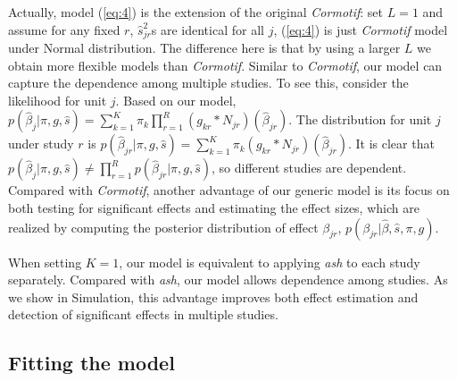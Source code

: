 \documentclass[12pt]{article}
\begin{document}
\vspace{4mm}\noindent Actually, model (\ref{eq:4}) is the extension of the original \emph{Cormotif}: set $L=1$ and assume for any fixed $r$, $\hat s_{jr}^2$s are identical for all $j$, (\ref{eq:4}) is just \emph{Cormotif} model under Normal distribution. The difference here is that by using a larger $L$ we obtain more flexible models than \emph{Cormotif}. Similar to \emph{Cormotif}, our model can capture the dependence among multiple studies. To see this, consider the likelihood for unit $j$. Based on our model, $p(\hat\beta_j|\pi,g,\hat s) = \sum_{k=1}^K\pi_k\prod_{r=1}^R(g_{kr}*N_{jr})(\hat\beta_{jr})$. The distribution for unit $j$ under study $r$ is $p(\hat\beta_{jr}|\pi,g,\hat s) = \sum_{k=1}^K\pi_k(g_{kr}*N_{jr})(\hat\beta_{jr})$. It is clear that $p(\hat\beta_j|\pi,g,\hat s) \neq \prod_{r=1}^Rp(\hat\beta_{jr}|\pi,g,\hat s)$, so different studies are dependent. Compared with \emph{Cormotif}, another advantage of our generic model is its focus on both testing for significant effects and estimating the effect sizes, which are realized by computing the posterior distribution of effect $\beta_{jr}$, $p(\beta_{jr}|\hat\beta,\hat s,\pi,g) $. 

\vspace{4mm}\noindent When setting $K =1$, our model is equivalent to applying \emph{ash} \cite{Stephens2017} to each study separately. Compared with \emph{ash}, our model allows dependence among studies. As we show in Simulation, this advantage improves both effect estimation and detection of significant effects in multiple studies. 

%

\vspace{5mm}
\subsection{Fitting the model}
\end{document}
